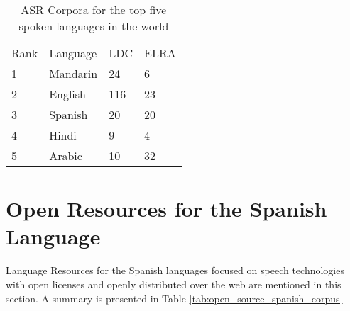 \documentclass[10pt, a4paper]{article}
\begin{document}
\begin{table}[h]
\caption{ASR Corpora for the top five spoken languages in the world \cite{HernndezMena2017}}
\label{tab:resources_by_langauge}
\begin{tabular}{llll}
Rank & Language & LDC & ELRA \\
1    & Mandarin & 24  & 6    \\
2    & English  & 116 & 23   \\
3    & Spanish  & 20  & 20   \\
4    & Hindi    & 9   & 4    \\
5    & Arabic   & 10  & 32  
\end{tabular}
\end{table}

\section{Open Resources for the Spanish Language}

Language Resources for the Spanish languages focused on speech technologies with open licenses and openly distributed over the web are mentioned in this section. A summary is presented in Table \ref{tab:open_source_spanish_corpus}
\end{document}

